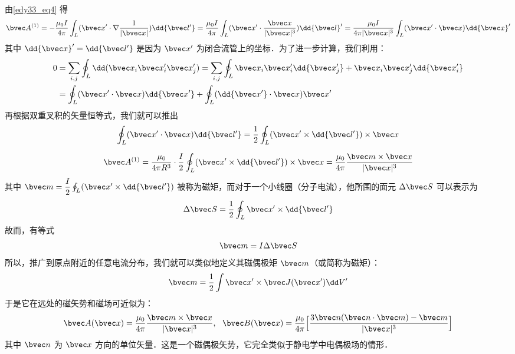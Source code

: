 由\autoref{edy33_eq4} 得
\begin{equation}
\bvec A^{(1)}=-\dfrac{\mu_0 I }{4\pi}\int_L (\bvec x^{\prime}\cdot\nabla\dfrac{1}{|\bvec x|}) \dd{\bvec l'}=\dfrac{\mu_0 I }{4\pi}\int_L (\bvec x^{\prime}\cdot\dfrac{\bvec x}{|\bvec x|^3})\dd {\bvec l}^{\prime}
=\dfrac{\mu_0 I }{4\pi|\bvec x|^3}\int_L (\bvec x^{\prime}\cdot \bvec x)\dd {\bvec x}^{\prime}
\label{edy33_eq7}
\end{equation}
其中 $\dd{\bvec x}^{\prime}=\dd{\bvec l'}$ 是因为 $ \bvec x^{\prime}$ 为闭合流管上的坐标．为了进一步计算，我们利用：
\begin{align}
0&=\sum_{i,j}\oint_L \dd(\bvec x_i \bvec x'_i \bvec x'_j)=\sum_{i,j}\oint_L \bvec x_i \bvec x'_i \dd {\bvec x'_j} + \bvec x_i \bvec x'_j \dd {\bvec x'_i} 
\label{edy33_eq8_0}
\\
&=
\oint_L (\bvec x^{\prime}\cdot\bvec x)\dd {\bvec x'}+\oint_L (\dd {\bvec x'}\cdot \bvec x)\bvec x^{\prime}\label{edy33_eq8}
\end{align}
再根据双重叉积的矢量恒等式，我们就可以推出
\begin{equation}
\oint_L (\bvec x^{\prime}\cdot \bvec x)\dd{\bvec l'}=\dfrac1 2\oint_L (\bvec x^{\prime}\times \dd{\bvec l'})\times \bvec x \label{edy33_eq9}
\end{equation}

\begin{equation}
\bvec A^{(1)}=\dfrac{\mu_0}{4\pi R^3}\cdot\dfrac{I}{2}\oint_L (\bvec x^{\prime}\times \dd{\bvec l'})\times \bvec x=\dfrac{\mu_0}{4\pi}\dfrac{\bvec m \times \bvec x}{|\bvec x|^3}\label{edy33_eq10}
\end{equation}
其中 $\bvec m =\dfrac{I}{2}\oint_L (\bvec x^{\prime}\times \dd{\bvec l'})$ 被称为磁矩，而对于一个小线圈（分子电流），他所围的面元 $\Delta\bvec S$ 可以表示为
\begin{equation}
\Delta\bvec S=\dfrac 1 2\oint_L \bvec x^{\prime}\times \dd{\bvec l'}
\end{equation}
故而，有等式
\begin{equation}
\bvec m=I\Delta \bvec S
\end{equation}
所以，推广到原点附近的任意电流分布，我们就可以类似地定义其磁偶极矩 $\bvec m$（或简称为磁矩）：
\begin{equation}
\bvec m=\frac{1}{2}\int \bvec x' \times \bvec J(\bvec x') \dd V'
\end{equation}
于是它在远处的磁矢势和磁场可近似为：
\begin{equation}
\bvec A(\bvec x)=\frac{\mu_0}{4\pi}\frac{\bvec m\times \bvec x}{|\bvec x|^3},\ \ 
\bvec B(\bvec x)=\frac{\mu_0}{4\pi}\Big [\frac{3\bvec n(\bvec n\cdot \bvec m)-\bvec m}{|\bvec x|^3}\Big]
\end{equation}
其中 $\bvec n$ 为 $\bvec x$ 方向的单位矢量．这是一个磁偶极矢势，它完全类似于静电学中电偶极场的情形．